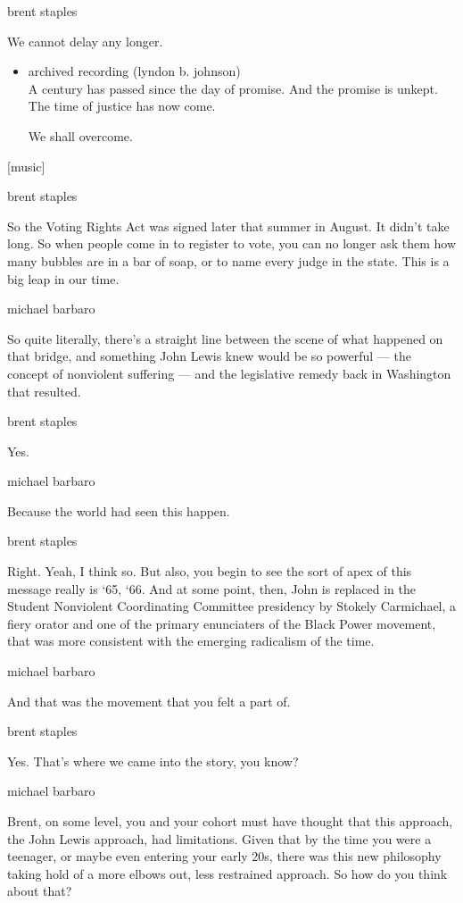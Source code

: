 brent staples

We cannot delay any longer.

\begin{itemize}
\item
  archived recording (lyndon b. johnson)\\
  A century has passed since the day of promise. And the promise is
  unkept. The time of justice has now come.

  We shall overcome.
\end{itemize}

{[}music{]}

brent staples

So the Voting Rights Act was signed later that summer in August. It
didn't take long. So when people come in to register to vote, you can no
longer ask them how many bubbles are in a bar of soap, or to name every
judge in the state. This is a big leap in our time.

michael barbaro

So quite literally, there's a straight line between the scene of what
happened on that bridge, and something John Lewis knew would be so
powerful --- the concept of nonviolent suffering --- and the legislative
remedy back in Washington that resulted.

brent staples

Yes.

michael barbaro

Because the world had seen this happen.

brent staples

Right. Yeah, I think so. But also, you begin to see the sort of apex of
this message really is `65, `66. And at some point, then, John is
replaced in the Student Nonviolent Coordinating Committee presidency by
Stokely Carmichael, a fiery orator and one of the primary enunciaters of
the Black Power movement, that was more consistent with the emerging
radicalism of the time.

michael barbaro

And that was the movement that you felt a part of.

brent staples

Yes. That's where we came into the story, you know?

michael barbaro

Brent, on some level, you and your cohort must have thought that this
approach, the John Lewis approach, had limitations. Given that by the
time you were a teenager, or maybe even entering your early 20s, there
was this new philosophy taking hold of a more elbows out, less
restrained approach. So how do you think about that?

